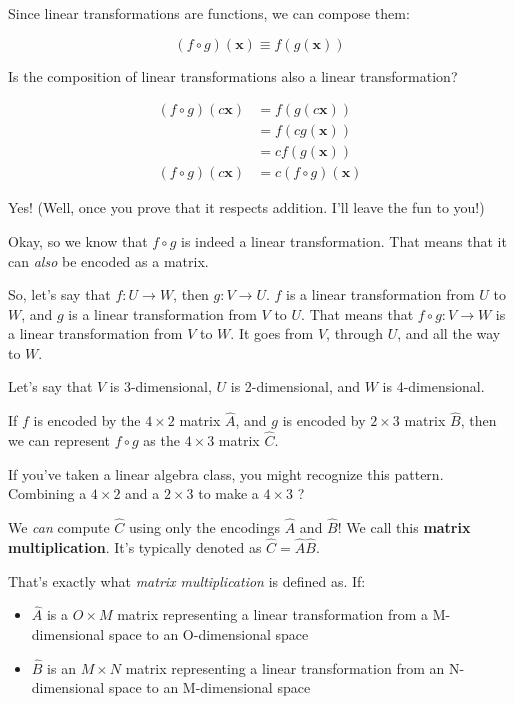 \documentclass[]{article}
\begin{document}
Since linear transformations are functions, we can compose them:

\[
(f \circ g)(\mathbf{x}) \equiv f(g(\mathbf{x}))
\]

Is the composition of linear transformations also a linear transformation?

\[
\begin{aligned}
(f \circ g)(c \mathbf{x}) & = f(g(c \mathbf{x})) \\
                      & = f(c g(\mathbf{x})) \\
                      & = c f(g(\mathbf{x})) \\
(f \circ g)(c \mathbf{x}) & = c (f \circ g)(\mathbf{x})
\end{aligned}
\]

Yes! (Well, once you prove that it respects addition. I'll leave the fun to
you!)

Okay, so we know that \(f \circ g\) is indeed a linear transformation. That
means that it can \emph{also} be encoded as a matrix.

So, let's say that \(f : U \rightarrow W\), then \(g : V \rightarrow U\). \(f\)
is a linear transformation from \(U\) to \(W\), and \(g\) is a linear
transformation from \(V\) to \(U\). That means that
\(f \circ g : V \rightarrow W\) is a linear transformation from \(V\) to \(W\).
It goes from \(V\), through \(U\), and all the way to \(W\).

Let's say that \(V\) is 3-dimensional, \(U\) is 2-dimensional, and \(W\) is
4-dimensional.

If \(f\) is encoded by the \(4 \times 2\) matrix \(\hat{A}\), and \(g\) is
encoded by \(2 \times 3\) matrix \(\hat{B}\), then we can represent
\(f \circ g\) as the \(4 \times 3\) matrix \(\hat{C}\).

If you've taken a linear algebra class, you might recognize this pattern.
Combining a \(4 \times 2\) and a \(2 \times 3\) to make a \(4 \times 3\) ?

We \emph{can} compute \(\hat{C}\) using only the encodings \(\hat{A}\) and
\(\hat{B}\)! We call this \textbf{matrix multiplication}. It's typically denoted
as \(\hat{C} = \hat{A} \hat{B}\).

That's exactly what \emph{matrix multiplication} is defined as. If:

\begin{itemize}
\tightlist
\item
  \(\hat{A}\) is a \(O \times M\) matrix representing a linear transformation
  from a M-dimensional space to an O-dimensional space
\item
  \(\hat{B}\) is an \(M \times N\) matrix representing a linear transformation
  from an N-dimensional space to an M-dimensional space
\end{itemize}
\end{document}
